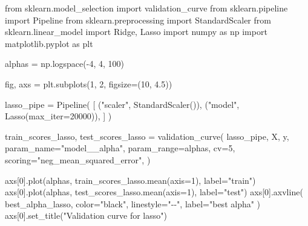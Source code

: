 \documentclass[
  letterpaper,
  DIV=11,
  numbers=noendperiod]{scrreprt}
\newenvironment{Shaded}{\begin{snugshade}}{\end{snugshade}}
\newcommand{\DecValTok}[1]{\textcolor[rgb]{0.68,0.00,0.00}{#1}}
\newcommand{\FloatTok}[1]{\textcolor[rgb]{0.68,0.00,0.00}{#1}}
\newcommand{\ImportTok}[1]{\textcolor[rgb]{0.00,0.46,0.62}{#1}}
\newcommand{\NormalTok}[1]{\textcolor[rgb]{0.00,0.23,0.31}{#1}}
\newcommand{\OperatorTok}[1]{\textcolor[rgb]{0.37,0.37,0.37}{#1}}
\newcommand{\StringTok}[1]{\textcolor[rgb]{0.13,0.47,0.30}{#1}}
\theoremstyle{definition}
\theoremstyle{definition}
\theoremstyle{plain}
\theoremstyle{plain}
\theoremstyle{remark}
\begin{document}
\begin{Shaded}
\begin{Highlighting}[]
\ImportTok{from}\NormalTok{ sklearn.model\_selection }\ImportTok{import}\NormalTok{ validation\_curve}
\ImportTok{from}\NormalTok{ sklearn.pipeline }\ImportTok{import}\NormalTok{ Pipeline}
\ImportTok{from}\NormalTok{ sklearn.preprocessing }\ImportTok{import}\NormalTok{ StandardScaler}
\ImportTok{from}\NormalTok{ sklearn.linear\_model }\ImportTok{import}\NormalTok{ Ridge, Lasso}
\ImportTok{import}\NormalTok{ numpy }\ImportTok{as}\NormalTok{ np}
\ImportTok{import}\NormalTok{ matplotlib.pyplot }\ImportTok{as}\NormalTok{ plt}

\NormalTok{alphas }\OperatorTok{=}\NormalTok{ np.logspace(}\OperatorTok{{-}}\DecValTok{4}\NormalTok{, }\DecValTok{4}\NormalTok{, }\DecValTok{100}\NormalTok{)}

\NormalTok{fig, axs }\OperatorTok{=}\NormalTok{ plt.subplots(}\DecValTok{1}\NormalTok{, }\DecValTok{2}\NormalTok{, figsize}\OperatorTok{=}\NormalTok{(}\DecValTok{10}\NormalTok{, }\FloatTok{4.5}\NormalTok{))}

\NormalTok{lasso\_pipe }\OperatorTok{=}\NormalTok{ Pipeline(}
\NormalTok{    [}
\NormalTok{        (}\StringTok{"scaler"}\NormalTok{, StandardScaler()),}
\NormalTok{        (}\StringTok{"model"}\NormalTok{, Lasso(max\_iter}\OperatorTok{=}\DecValTok{20000}\NormalTok{)),}
\NormalTok{    ]}
\NormalTok{)}

\NormalTok{train\_scores\_lasso, test\_scores\_lasso }\OperatorTok{=}\NormalTok{ validation\_curve(}
\NormalTok{    lasso\_pipe,}
\NormalTok{    X,}
\NormalTok{    y,}
\NormalTok{    param\_name}\OperatorTok{=}\StringTok{"model\_\_alpha"}\NormalTok{,}
\NormalTok{    param\_range}\OperatorTok{=}\NormalTok{alphas,}
\NormalTok{    cv}\OperatorTok{=}\DecValTok{5}\NormalTok{,}
\NormalTok{    scoring}\OperatorTok{=}\StringTok{"neg\_mean\_squared\_error"}\NormalTok{,}
\NormalTok{)}

\NormalTok{axs[}\DecValTok{0}\NormalTok{].plot(alphas, train\_scores\_lasso.mean(axis}\OperatorTok{=}\DecValTok{1}\NormalTok{), label}\OperatorTok{=}\StringTok{"train"}\NormalTok{)}
\NormalTok{axs[}\DecValTok{0}\NormalTok{].plot(alphas, test\_scores\_lasso.mean(axis}\OperatorTok{=}\DecValTok{1}\NormalTok{), label}\OperatorTok{=}\StringTok{"test"}\NormalTok{)}
\NormalTok{axs[}\DecValTok{0}\NormalTok{].axvline(}
\NormalTok{    best\_alpha\_lasso, color}\OperatorTok{=}\StringTok{"black"}\NormalTok{, linestyle}\OperatorTok{=}\StringTok{"{-}{-}"}\NormalTok{, label}\OperatorTok{=}\StringTok{"best alpha"}
\NormalTok{)}
\NormalTok{axs[}\DecValTok{0}\NormalTok{].set\_title(}\StringTok{"Validation curve for lasso"}\NormalTok{)}



\end{Highlighting}
\end{Shaded}
\end{document}
